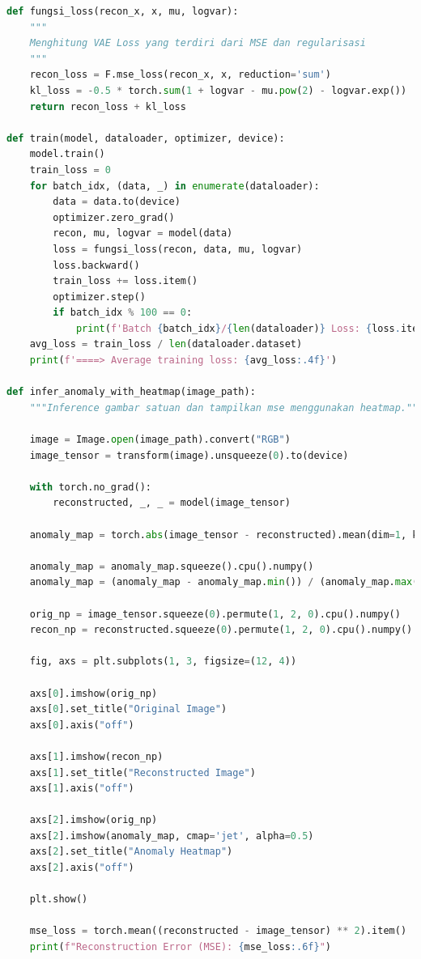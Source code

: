 \begin{lstlisting}[language=Python]
def fungsi_loss(recon_x, x, mu, logvar):
    """
    Menghitung VAE Loss yang terdiri dari MSE dan regularisasi
    """
    recon_loss = F.mse_loss(recon_x, x, reduction='sum')
    kl_loss = -0.5 * torch.sum(1 + logvar - mu.pow(2) - logvar.exp())
    return recon_loss + kl_loss

def train(model, dataloader, optimizer, device):
    model.train()
    train_loss = 0
    for batch_idx, (data, _) in enumerate(dataloader):
        data = data.to(device)
        optimizer.zero_grad()
        recon, mu, logvar = model(data)
        loss = fungsi_loss(recon, data, mu, logvar)
        loss.backward()
        train_loss += loss.item()
        optimizer.step()
        if batch_idx % 100 == 0:
            print(f'Batch {batch_idx}/{len(dataloader)} Loss: {loss.item()/len(data):.4f}')
    avg_loss = train_loss / len(dataloader.dataset)
    print(f'====> Average training loss: {avg_loss:.4f}')

def infer_anomaly_with_heatmap(image_path):
    """Inference gambar satuan dan tampilkan mse menggunakan heatmap."""

    image = Image.open(image_path).convert("RGB")
    image_tensor = transform(image).unsqueeze(0).to(device)

    with torch.no_grad():
        reconstructed, _, _ = model(image_tensor)

    anomaly_map = torch.abs(image_tensor - reconstructed).mean(dim=1, keepdim=True)

    anomaly_map = anomaly_map.squeeze().cpu().numpy()
    anomaly_map = (anomaly_map - anomaly_map.min()) / (anomaly_map.max() - anomaly_map.min())

    orig_np = image_tensor.squeeze(0).permute(1, 2, 0).cpu().numpy()
    recon_np = reconstructed.squeeze(0).permute(1, 2, 0).cpu().numpy()

    fig, axs = plt.subplots(1, 3, figsize=(12, 4))

    axs[0].imshow(orig_np)
    axs[0].set_title("Original Image")
    axs[0].axis("off")

    axs[1].imshow(recon_np)
    axs[1].set_title("Reconstructed Image")
    axs[1].axis("off")

    axs[2].imshow(orig_np)
    axs[2].imshow(anomaly_map, cmap='jet', alpha=0.5)
    axs[2].set_title("Anomaly Heatmap")
    axs[2].axis("off")

    plt.show()

    mse_loss = torch.mean((reconstructed - image_tensor) ** 2).item()
    print(f"Reconstruction Error (MSE): {mse_loss:.6f}")


\end{lstlisting}
